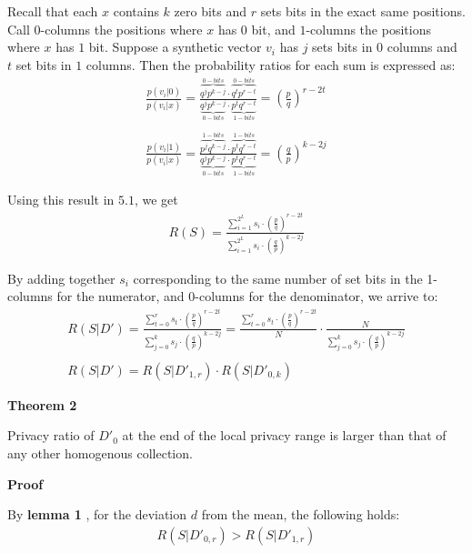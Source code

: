\documentclass[11pt,draft]{article}
\begin{document}
Recall that each $x$ contains $k$ zero bits and $r$ sets bits in the exact same positions.   Call $0$-columns the positions where $x$ has 0 bit, and $1$-columns the positions where $x$ has $1$ bit. Suppose a synthetic vector $v_i$ has $j$ sets bits in $0$ columns and $t$ set bits in $1$ columns.   Then the probability ratios for each sum is  expressed as: 
\begin{align}
\frac{p(v_i|0)}{p(v_i|x)} = \frac{ \overset{0-bits}{\overbrace{q^jp^{k-j} }} \cdot   \overset{0-bits}{\overbrace{q^tp^{r-t}}}}{    \underset{0-bits}{\underbrace{q^jp^{k-j}}} \cdot  \underset{1-bits}{\underbrace{p^tq^{r-t}}}  } = \left ( \frac{p}{q} \right )^{r-2t} \\
\\
\frac{p(v_i|1)}{p(v_i|x)} =  \frac{ \overset{1-bits}{\overbrace{p^jq^{k-j} }} \cdot   \overset{1-bits}{\overbrace{p^tq^{r-t}}}}{    \underset{0-bits}{\underbrace{q^jp^{k-j}}} \cdot  \underset{1-bits}{\underbrace{p^tq^{r-t}}}  } = \left ( \frac{q}{p} \right )^{k-2j} 
\end{align}

Using this result in $5.1$, we get 
\begin{align}
R(S) = \frac{ \sum_{i=1}^{2^L} s_i  \cdot   \left ( \frac{p}{q} \right )^{r-2t}   } { \sum_{i=1}^{2^L}  s_i \cdot \left ( \frac{q}{p} \right )^{k-2j}   } 
\end{align}

By adding together $s_i$ corresponding to the same number of set bits in the 1-columns for the numerator, and 0-columns for the denominator, we arrive to:
\begin{align}
R(S|D') = \frac{ \sum_{t=0}^{r} s_t  \cdot   \left ( \frac{p}{q} \right )^{r-2t}   } { \sum_{j=0}^{k}  s_j \cdot \left ( \frac{q}{p} \right )^{k-2j}   }  = \frac{ \sum_{t=0}^{r} s_t  \cdot   \left ( \frac{p}{q} \right )^{r-2t}   } {N}  \cdot \frac{N}{ \sum_{j=0}^{k}  s_j \cdot \left ( \frac{q}{p} \right )^{k-2j}   } \\
\\
R(S|D') = R(S|D'_{1,r}) \cdot R(S|D'_{0,k})
\end{align}

\textbf{Theorem 2}

Privacy ratio of  $D'_0$  at the end of the local privacy range is larger than that of any other homogenous collection. 

\textbf{Proof}

By \textbf{lemma 1} , for the deviation $d$ from the mean, the following holds:
\begin{align}
R(S|D'_{0,r}) >  R(S|D'_{1,r})
\end{align}
\end{document}
